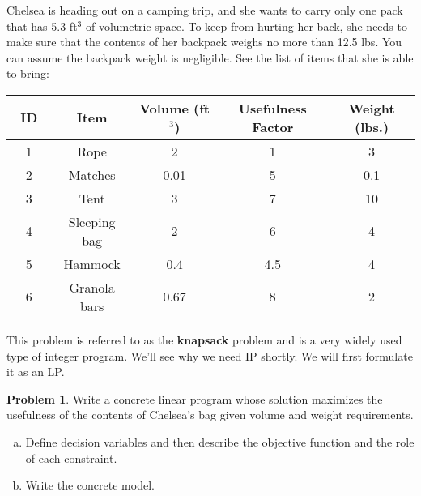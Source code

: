 \documentclass[12pt]{article}
\theoremstyle{definition}
\newtheorem{problem}{Problem}
\begin{document}
Chelsea is heading out on a camping trip, and she wants to carry only one pack that has 5.3 ft$^3$ of volumetric space. To keep from hurting her back, she needs to make sure that the contents of her backpack weighs no more than 12.5 lbs. You can assume the backpack weight is negligible. See the list of items that she is able to bring:

\begin{center}
\begin{tabular}{|c|c |c| c| c|}
\hline
~ID~ & Item & Volume (ft$^3$) & Usefulness Factor & Weight (lbs.)\\ \hline
1 & Rope & 2 & 1 & 3 \\ \hline
2 & Matches & 0.01 & 5 & 0.1 \\  \hline
3 & Tent & 3 & 7 & 10   \\ \hline
4 & Sleeping bag & 2 & 6 & 4   \\ \hline
5 & Hammock & 0.4 & 4.5 & 4   \\ \hline
6 & Granola bars & 0.67 & 8 & 2   \\ \hline
\end{tabular}
\end{center}

This problem is referred to as the \textbf{knapsack} problem and is a very widely used type of integer program. We'll see why we need IP shortly. We will first formulate it as an LP.


\begin{problem}  Write a concrete linear program whose solution maximizes the usefulness of the contents of Chelsea's bag given volume and weight requirements.

\begin{enumerate}[a)]
\item Define decision variables and then describe the objective function and the role of each constraint. 

\pagebreak

\item Write the concrete model.






\end{enumerate}
\end{problem}
\end{document}
